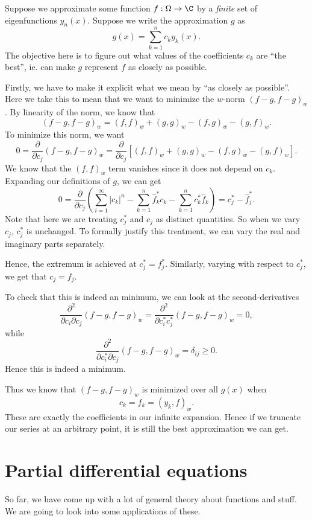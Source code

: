 \documentclass[a4paper]{article}
\begin{document}
Suppose we approximate some function $f: \Omega \to \C$ by a \emph{finite} set of eigenfunctions $y_n(x)$. Suppose we write the approximation $g$ as
\[
  g(x) = \sum_{k = 1}^n c_k y_k(x).
\]
The objective here is to figure out what values of the coefficients $c_k$ are ``the best'', ie. can make $g$ represent $f$ as closely as possible.

Firstly, we have to make it explicit what we mean by ``as closely as possible''. Here we take this to mean that we want to minimize the $w$-norm $(f - g, f - g)_w$. By linearity of the norm, we know that
\[
  (f - g, f - g)_w = (f, f)_w + (g, g)_w - (f, g)_w - (g, f)_w.
\]
To minimize this norm, we want
\[
  0 = \frac{\partial}{\partial c_j} (f - g, f - g)_w = \frac{\partial}{\partial c_j}[(f, f)_w + (g, g)_w - (f, g)_w - (g, f)_w].
\]
We know that the $(f, f)_w$ term vanishes since it does not depend on $c_k$. Expanding our definitions of $g$, we can get
\[
  0 = \frac{\partial}{\partial c_j}\left(\sum_{i = 1}^\infty |c_k|^n - \sum_{k = 1}^n \hat{f}_k^* c_k  - \sum_{k = 1}^n c_k^* \hat{f}_k\right) = c^*_j - \hat{f}_j^*.
\]
Note that here we are treating $c_j^*$ and $c_j$ as distinct quantities. So when we vary $c_j$, $c_j^*$ is unchanged. To formally justify this treatment, we can vary the real and imaginary parts separately.

Hence, the extremum is achieved at $c_j^* = f_j^*$. Similarly, varying with respect to $c_j^*$, we get that $c_j = f_j$.

To check that this is indeed an minimum, we can look at the second-derivatives
\[
  \frac{\partial^2}{\partial c_i \partial c_j} (f - g, f - g)_w = \frac{\partial^2}{\partial c_i^* c_j^*} (f - g, f - g)_w = 0,
\]
while
\[
  \frac{\partial^2}{\partial c_i^* \partial c_j} (f - g, f - g)_w = \delta_{ij} \geq 0.
\]
Hence this is indeed a minimum.

Thus we know that $(f - g, f - g)_w$ is minimized over all $g(x)$ when
\[
  c_k = \hat{f}_k = (y_k, f)_w.
\]
These are exactly the coefficients in our infinite expansion. Hence if we truncate our series at an arbitrary point, it is still the best approximation we can get.

\section{Partial differential equations}
So far, we have come up with a lot of general theory about functions and stuff. We are going to look into some applications of these.
\end{document}
